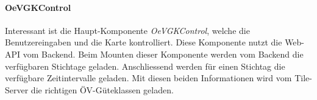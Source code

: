 \paragraph{OeVGKControl}
Interessant ist die Haupt-Komponente \emph{OeVGKControl}, welche die Benutzereingaben und die Karte kontrolliert.
Diese Komponente nutzt die Web-\acs{API} vom Backend.
Beim Mounten dieser Komponente werden vom Backend die verfügbaren Stichtage geladen.
Anschliessend werden für einen Stichtag die verfügbare Zeitintervalle geladen.
Mit diesen beiden Informationen wird vom Tile-Server die richtigen \acs{ÖV-Güteklassen} geladen.